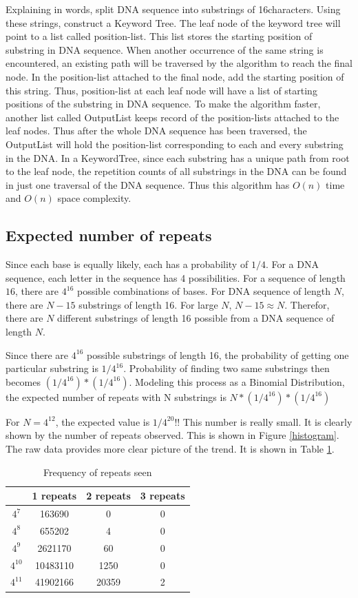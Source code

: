 \documentclass{article}
\begin{document}
Explaining in words, split DNA sequence into substrings of 16characters. Using these strings, construct a Keyword Tree. The leaf node of the keyword tree will point to a list called position-list. This list stores the starting position of substring in DNA sequence. When another occurrence of the same string is encountered, an existing path will be traversed by the algorithm to reach the final node. In the position-list attached to the final node, add the starting position of this string. Thus, position-list at each leaf node will have a list of starting positions of the substring in DNA sequence. To make the algorithm faster, another list called OutputList keeps record of the position-lists attached to the leaf nodes. Thus after the whole DNA sequence has been traversed, the OutputList will hold the position-list corresponding to each and every substring in the DNA. In a KeywordTree, since each substring has a unique path from root to the leaf node, the repetition counts of all substrings in the DNA can be found in just one traversal of the DNA sequence. Thus this algorithm has $O(n)$ time and $O(n)$ space complexity.

\subsection{Expected number of repeats}
	Since each base is equally likely, each has a probability of $1/4$. For a DNA sequence, each letter in the sequence has 4 possibilities. For a sequence of length $16$, there are $4^{16}$ possible combinations of bases. For DNA sequence of length $N$, there are $N-15$ substrings of length 16. For large $N$, $N-15 \approx N$. Therefor, there are $N$ different substrings of length 16 possible from a DNA sequence of length $N$.

	Since there are $4^{16}$ possible substrings of length 16, the probability of getting one particular substring is $1/4^{16}$. Probability of finding two same substrings then becomes $(1/4^{16}) * (1/4^{16})$. Modeling this process as a Binomial Distribution, the expected number of repeats with N substrings is $N*(1/4^{16}) * (1/4^{16})$

	For $N = 4^{12}$, the expected value is $1/4^{20}$!! This number is really small. It is clearly shown by the number of repeats observed. This is shown in Figure \ref{histogram}. The raw data provides more clear picture of the trend. It is shown in Table \ref{tab:hist}. \\

\begin{table}
\caption{Frequency of repeats seen}
\label{tab:hist}	
\begin{tabular}{|c|c|c|c|}
\hline
	&	1 repeats	& 2 repeats	& 3 repeats \\ \hline
$4^{7}$	& 163690 &	0	& 0 \\ \hline
$4^8$	& 655202	& 4	& 0 \\ \hline
$4^9$	& 2621170 &	60 &	0 \\ \hline
$4^{10}$	& 10483110 & 	1250 &	0 \\ \hline
$4^{11}$ & 	41902166 &	20359	& 2 \\ \hline
\end{tabular}
\end{table}
\end{document}
